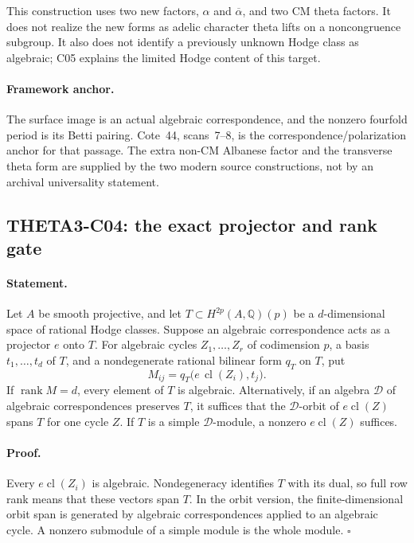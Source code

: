 \documentclass[11pt]{article}
\newcommand{\Q}{\mathbb Q}\newcommand{\C}{\mathbb C}\newcommand{\Z}{\mathbb Z}\newcommand{\R}{\mathbb R}\newcommand{\A}{\mathbb A}\newcommand{\OO}{\mathcal O}
\theoremstyle{definition}\newtheorem{definition}[theorem]{Definition}\newtheorem{remark}[theorem]{Remark}
\begin{document}
This construction uses two new factors, $\alpha$ and
$\overline\alpha$, and two CM theta factors. It does not realize
the new forms as adelic character theta lifts on a noncongruence
subgroup. It also does not identify a previously unknown Hodge class
as algebraic; C05 explains the limited Hodge content of this target.

\paragraph{Framework anchor.}
The surface image is an actual algebraic correspondence, and the nonzero
fourfold period is its Betti pairing.  Cote~44, scans~7--8, is the
correspondence/polarization anchor for that passage.  The extra non-CM
Albanese factor and the transverse theta form are supplied by the two
modern source constructions, not by an archival universality statement.

\subsection{THETA3-C04: the exact projector and rank gate}\label{C04}

\paragraph{Statement.}
Let $A$ be smooth projective, and let
$T\subset H^{2p}(A,\Q)(p)$ be a $d$-dimensional space of rational
Hodge classes. Suppose an algebraic correspondence acts as a
projector $e$ onto $T$. For algebraic cycles $Z_1,\ldots,Z_r$ of
codimension $p$, a basis $t_1,\ldots,t_d$ of $T$, and a
nondegenerate rational bilinear form $q_T$ on $T$, put
\[
 M_{ij}=q_T\bigl(e\,\operatorname{cl}(Z_i),t_j\bigr).
\]
If $\operatorname{rank}M=d$, every element of $T$ is algebraic.
Alternatively, if an algebra $\mathcal D$ of algebraic
correspondences preserves $T$, it suffices that the
$\mathcal D$-orbit of $e\operatorname{cl}(Z)$ spans $T$ for one
cycle $Z$. If $T$ is a simple $\mathcal D$-module, a nonzero
$e\operatorname{cl}(Z)$ suffices.

\paragraph{Proof.}
Every $e\operatorname{cl}(Z_i)$ is algebraic. Nondegeneracy
identifies $T$ with its dual, so full row rank means that these
vectors span $T$. In the orbit version, the finite-dimensional
orbit span is generated by algebraic correspondences applied to an
algebraic cycle. A nonzero submodule of a simple module is the whole
module. $\square$
\end{document}
